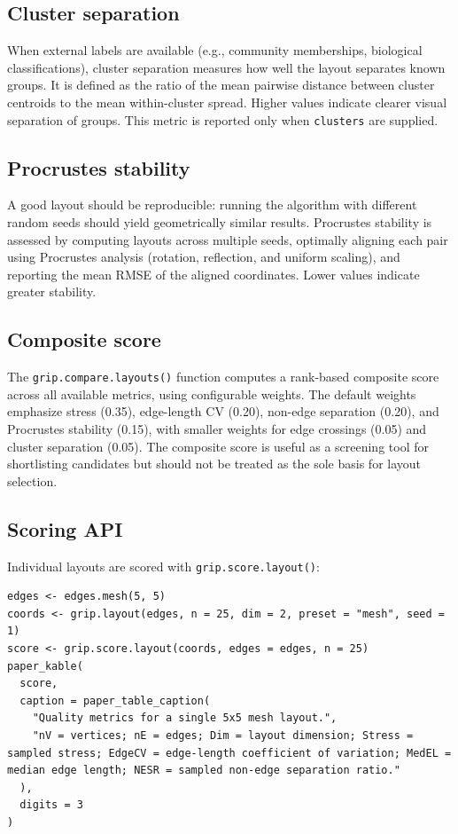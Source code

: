 \subsection{Cluster separation}\label{cluster-separation}

When external labels are available (e.g., community memberships, biological
classifications), cluster separation measures how well the layout separates
known groups. It is defined as the ratio of the mean pairwise distance
between cluster centroids to the mean within-cluster spread. Higher values
indicate clearer visual separation of groups. This metric is reported only
when \texttt{clusters} are supplied.

\subsection{Procrustes stability}\label{procrustes-stability}

A good layout should be reproducible: running the algorithm with different
random seeds should yield geometrically similar results. Procrustes stability
is assessed by computing layouts across multiple seeds, optimally aligning
each pair using Procrustes analysis (rotation, reflection, and uniform
scaling), and reporting the mean RMSE of the aligned coordinates. Lower
values indicate greater stability.

\subsection{Composite score}\label{composite-score}

The \texttt{grip.compare.layouts()} function computes a rank-based composite score
across all available metrics, using configurable weights. The default weights
emphasize stress (0.35), edge-length CV (0.20), non-edge separation (0.20),
and Procrustes stability (0.15), with smaller weights for edge crossings
(0.05) and cluster separation (0.05). The composite score is useful as a
screening tool for shortlisting candidates but should not be treated as the
sole basis for layout selection.

\subsection{Scoring API}\label{scoring-api}

Individual layouts are scored with \texttt{grip.score.layout()}:

\begin{verbatim}
edges <- edges.mesh(5, 5)
coords <- grip.layout(edges, n = 25, dim = 2, preset = "mesh", seed = 1)
score <- grip.score.layout(coords, edges = edges, n = 25)
paper_kable(
  score,
  caption = paper_table_caption(
    "Quality metrics for a single 5x5 mesh layout.",
    "nV = vertices; nE = edges; Dim = layout dimension; Stress = sampled stress; EdgeCV = edge-length coefficient of variation; MedEL = median edge length; NESR = sampled non-edge separation ratio."
  ),
  digits = 3
)
\end{verbatim}

